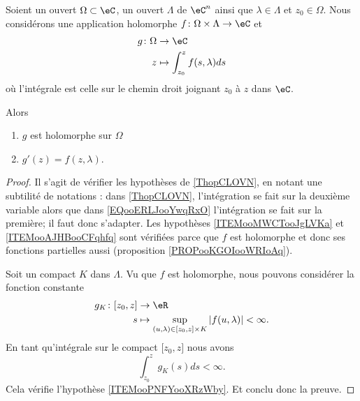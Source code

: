 \begin{proposition}	\label{PROPooSOAWooDZswKV}
	Soient un ouvert \( \Omega\subset \eC\), un ouvert \( \Lambda\) de \( \eC^n\) ainsi que \( \lambda\in\Lambda\) et \( z_0\in \Omega\). Nous considérons une application holomorphe \(f \colon \Omega\times \Lambda\to \eC  \) et
	\begin{equation}		\label{EQooERLJooYwqRxO}
		\begin{aligned}
			g\colon \Omega & \to \eC                            \\
			z              & \mapsto \int_{z_0}^zf(s,\lambda)ds
		\end{aligned}
	\end{equation}
	où l'intégrale est celle sur le chemin droit joignant \( z_0\) à \( z\) dans \( \eC\).

	Alors
	\begin{enumerate}
		\item
		      \( g\) est holomorphe sur \( \Omega\)
		\item		\label{ITEMooJWJOooCNjrDl}
		      \( g'(z)=f(z,\lambda)\).
	\end{enumerate}
\end{proposition}

\begin{proof}
	Il s'agit de vérifier les hypothèses de \ref{ThopCLOVN}, en notant une subtilité de notations : dans \ref{ThopCLOVN}, l'intégration se fait sur la deuxième variable alors que dans \eqref{EQooERLJooYwqRxO} l'intégration se fait sur la première; il faut donc s'adapter. Les hypothèses \ref{ITEMooMWCTooJgLVKa} et \ref{ITEMooAJHBooCFqhfq} sont vérifiées parce que \( f\) est holomorphe et donc ses fonctions partielles aussi (proposition \ref{PROPooKGOIooWRIoAq}).

	Soit un compact \( K\) dans \( \Lambda\). Vu que \( f\) est holomorphe, nous pouvons considérer la fonction constante
	\begin{equation}
		\begin{aligned}
			g_K\colon \mathopen[ z_0,z\mathclose] & \to \eR                                                                                   \\
			s                                     & \mapsto \sup_{(u,\lambda)\in \mathopen[ z_0,z\mathclose]\times K}| f(u,\lambda) |<\infty.
		\end{aligned}
	\end{equation}
	En tant qu'intégrale sur le compact \( \mathopen[ z_0,z\mathclose]\) nous avons
	\begin{equation}
		\int_{z_0}^zg_K(s)ds<\infty.
	\end{equation}
	Cela vérifie l'hypothèse \ref{ITEMooPNFYooXRzWby}. Et conclu donc la preuve.
\end{proof}

